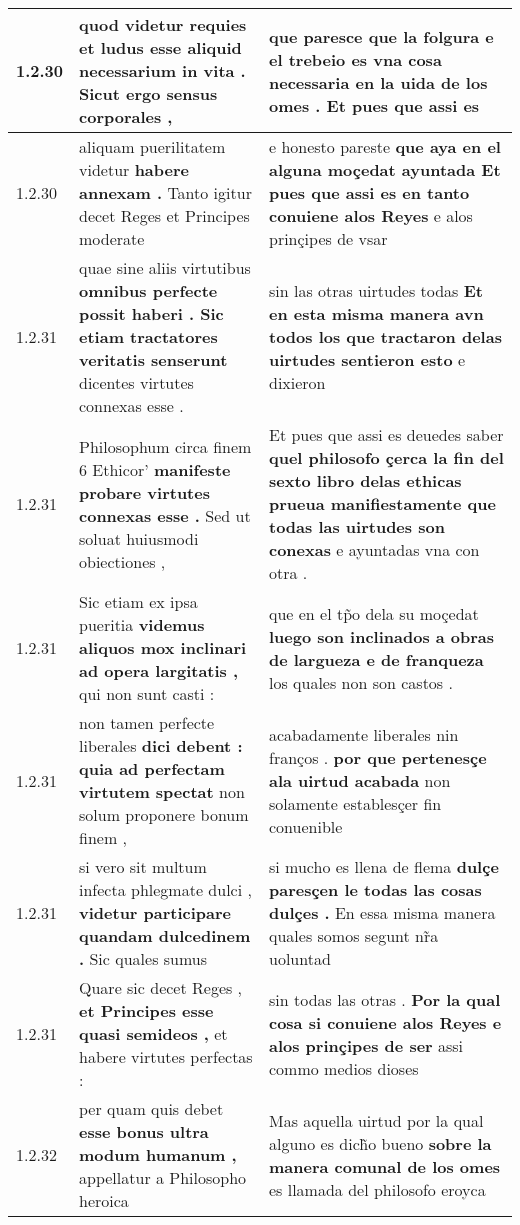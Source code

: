 \begin{tabular}{|p{1cm}|p{6.5cm}|p{6.5cm}|}
1.2.30 & quod videtur requies \textbf{ et ludus esse aliquid necessarium in vita . } Sicut ergo sensus corporales , & que paresce que la folgura \textbf{ e el trebeio es vna cosa necessaria en la uida de los omes . } Et pues que assi es \\\hline
1.2.30 & aliquam puerilitatem videtur \textbf{ habere annexam . } Tanto igitur decet Reges et Principes moderate & e honesto pareste \textbf{ que aya en el alguna moçedat ayuntada Et pues que assi es en tanto conuiene alos Reyes } e alos prinçipes de vsar \\\hline
1.2.31 & quae sine aliis virtutibus \textbf{ omnibus perfecte possit haberi . Sic etiam tractatores veritatis senserunt } dicentes virtutes connexas esse . & sin las otras uirtudes todas \textbf{ Et en esta misma manera avn todos los que tractaron delas uirtudes sentieron esto } e dixieron \\\hline
1.2.31 & Philosophum circa finem 6 Ethicor’ \textbf{ manifeste probare virtutes connexas esse . } Sed ut soluat huiusmodi obiectiones , & Et pues que assi es deuedes saber \textbf{ quel philosofo çerca la fin del sexto libro delas ethicas prueua manifiestamente que todas las uirtudes son conexas } e ayuntadas vna con otra . \\\hline
1.2.31 & Sic etiam ex ipsa pueritia \textbf{ videmus aliquos mox inclinari ad opera largitatis , } qui non sunt casti : & que en el tp̃o dela su moçedat \textbf{ luego son inclinados a obras de largueza e de franqueza } los quales non son castos . \\\hline
1.2.31 & non tamen perfecte liberales \textbf{ dici debent : quia ad perfectam virtutem spectat } non solum proponere bonum finem , & acabadamente liberales nin franços . \textbf{ por que pertenesçe ala uirtud acabada } non solamente establesçer fin conuenible \\\hline
1.2.31 & si vero sit multum infecta phlegmate dulci , \textbf{ videtur participare quandam dulcedinem . } Sic quales sumus & si mucho es llena de flema \textbf{ dulçe paresçen le todas las cosas dulçes . } En essa misma manera quales somos segunt nr̃a uoluntad \\\hline
1.2.31 & Quare sic decet Reges , \textbf{ et Principes esse quasi semideos , } et habere virtutes perfectas : & sin todas las otras . \textbf{ Por la qual cosa si conuiene alos Reyes e alos prinçipes de ser } assi commo medios dioses \\\hline
1.2.32 & per quam quis debet \textbf{ esse bonus ultra modum humanum , } appellatur a Philosopho heroica & Mas aquella uirtud por la qual alguno es dich̃o bueno \textbf{ sobre la manera comunal de los omes } es llamada del philosofo eroyca \\\hline

\end{tabular}
